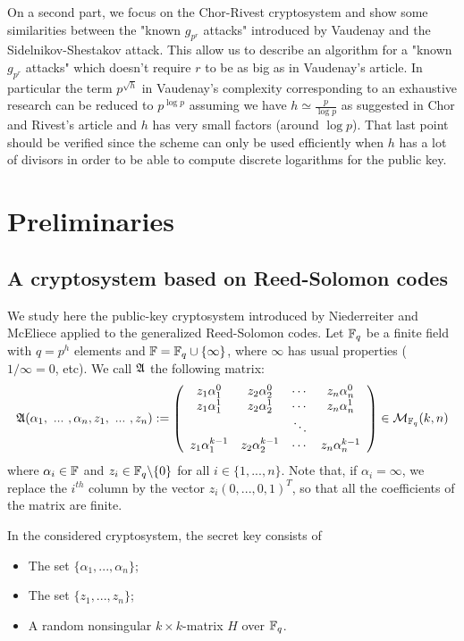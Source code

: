 \documentclass[12pt,a4paper,titlepage]{article}
\begin{document}
On a second part, we focus on the Chor-Rivest cryptosystem and show some similarities between the "known $g_{p^r}$ attacks" introduced by Vaudenay and the  Sidelnikov-Shestakov attack. This allow us to describe an algorithm for a "known $g_{p^r}$ attacks" which doesn't require $r$ to be as big as in Vaudenay's article. In particular the term $p^{\sqrt{h}}$ in Vaudenay's complexity corresponding to an exhaustive research can be reduced to $p^{\log p}$ assuming we have $h \simeq \frac{p}{\log p}$ as suggested in Chor and Rivest's article and $h$ has very small factors (around $\log p$). That last point should be verified since the scheme can only be used efficiently when $h$ has a lot of divisors in order to be able to compute discrete logarithms for the public key.



\newpage
\section{Preliminaries}
\label{sec:Prel}


\subsection{A cryptosystem based on Reed-Solomon codes}

We study here the public-key cryptosystem introduced by Niederreiter and McEliece \cite{NiederH86} applied to the generalized Reed-Solomon codes. Let $\mathbb{F}_q$ be a finite field with $q = p^h$ elements and $\mathbb{F} = \mathbb{F}_q \cup \{ \infty \}$, where $\infty$ has usual properties ( $1/\infty = 0$, etc). We call $\mathfrak{A}$ the following matrix:
$$ \mathfrak{A}(\alpha_1, \ ... \ , \alpha_n, z_1, \ ... \ , z_n) := \left(
\begin{array}{cccc}
z_1 \alpha_1^0 &  z_2 \alpha_2^0 & \cdots & z_n \alpha_n^0 \\
z_1 \alpha_1^1 &  z_2 \alpha_2^1 & \cdots & z_n \alpha_n^1 \\
 & & \ddots & \\
z_1 \alpha_1^{k-1} &  z_2 \alpha_2^{k-1} & \cdots & z_n \alpha_n^{k-1}
\end{array}
\right) \in \mathcal{M}_{\mathbb{F}_q}(k,n) $$
where $\alpha_i \in \mathbb{F}$ and $z_i \in \mathbb{F}_q\backslash\{0\}$ for all $i \in \{1,...,n\}$. Note that, if $\alpha_i = \infty$, we replace the $i^{th}$ column by the vector $z_i(0,...,0,1)^T$, so that all the coefficients of the matrix are finite.

\bigskip

In the considered cryptosystem, the secret key consists of
\begin{itemize}
\item The set $\{\alpha_1,... ,\alpha_n\}$;
\item The set $\{z_1,... ,z_n\}$;
\item A random nonsingular $k\times k$-matrix $H$ over $\mathbb{F}_q$.
\end{itemize}
\end{document}
